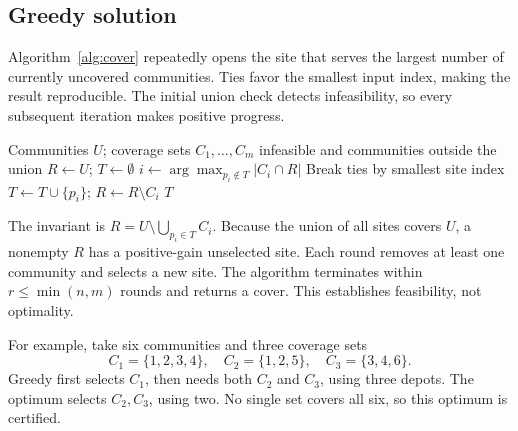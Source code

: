 \documentclass[sigconf,nonacm]{acmart}
\begin{document}
\subsection{Greedy solution}
Algorithm~\ref{alg:cover} repeatedly opens the site that serves the largest
number of currently uncovered communities. Ties favor the smallest input
index, making the result reproducible. The initial union check detects
infeasibility, so every subsequent iteration makes positive progress.

\begin{algorithm}[t]
\caption{Greedy emergency depot selection}\label{alg:cover}
\begin{algorithmic}[1]
\Require Communities $U$; coverage sets $C_1,\ldots,C_m$
  \State \Return infeasible and communities outside the union
\EndIf
\State $R\gets U$; $T\gets\emptyset$
  \State $i\gets\arg\max_{p_i\notin T}|C_i\cap R|$
  \State Break ties by smallest site index
  \State $T\gets T\cup\{p_i\}$; $R\gets R\setminus C_i$
\EndWhile
\State \Return $T$
\end{algorithmic}
\end{algorithm}

The invariant is $R=U\setminus\bigcup_{p_i\in T}C_i$. Because the union of
all sites covers $U$, a nonempty $R$ has a positive-gain unselected site.
Each round removes at least one community and selects a new site. The
algorithm terminates within $r\le\min(n,m)$ rounds and returns a cover.
This establishes feasibility, not optimality.

For example, take six communities and three coverage sets
\[
C_1=\{1,2,3,4\},\quad C_2=\{1,2,5\},\quad C_3=\{3,4,6\}.
\]
Greedy first selects $C_1$, then needs both $C_2$ and $C_3$, using three
depots. The optimum selects $C_2,C_3$, using two. No single set covers all
six, so this optimum is certified.
\end{document}
